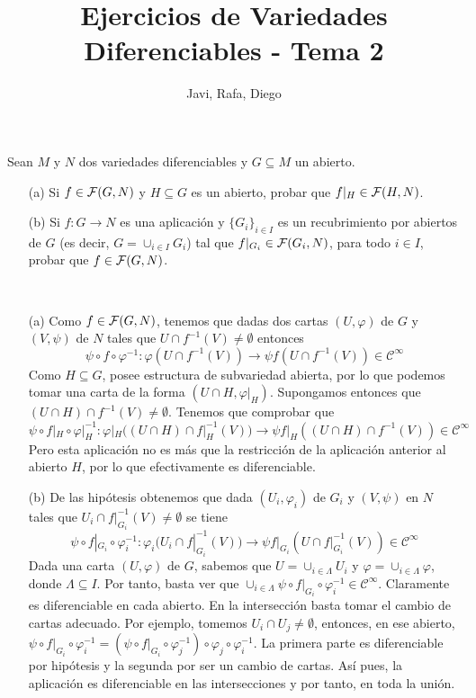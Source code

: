 \documentclass[twoside]{article}
\begin{document}
\title{Ejercicios de Variedades Diferenciables - Tema 2}
\author{Javi, Rafa, Diego}
\maketitle



\begin{ejercicio}{1}\label{1}
Sean $M$ y $N$ dos variedades diferenciables y $G \subseteq M$ un abierto.
\begin{itemize}
\item[(a)] Si $f \in \mathcal{F}(G,N)$ y $H \subseteq G$ es un abierto, probar que $f|_H \in \mathcal{F}(H,N)$.
\item[(b)] Si $f: G \to N$ es una aplicación y $\{G_i\}_{i\in I}$ es un recubrimiento por
abiertos de $G$ (es decir, $G = \cup_{i\in I} G_i$) tal que $f|_{G_i} \in \mathcal{F}(G_i,N)$, para
todo $i \in I$, probar que $f \in \mathcal{F}(G,N)$.
\end{itemize}
\end{ejercicio}
\begin{solucion}\
\begin{itemize}
\item[(a)]Como $f\in\mathcal{F}(G,N)$, tenemos que dadas dos cartas $(U,\varphi)$ de $G$ y $(V,\psi)$ de $N$ tales que $U\cap f^{-1}(V)\neq\emptyset$ entonces
$$\psi\circ f\circ\varphi^{-1}:\varphi(U\cap f^{-1}(V))\to\psi f(U\cap f^{-1}(V))\in\mathcal{C}^\infty$$ 
Como $H\subseteq G$, posee estructura de subvariedad abierta, por lo que podemos tomar una carta de la forma $(U\cap H,\varphi|_H)$. Supongamos entonces que $(U\cap H)\cap f^{-1}(V)\neq\emptyset$. Tenemos que comprobar que 
$$\psi\circ f|_H\circ\varphi|_H^{-1}:\varphi|_H((U\cap H)\cap f|_H^{-1}(V))\to\psi f|_H((U\cap H)\cap f^{-1}(V))\in\mathcal{C}^\infty$$ 
Pero esta aplicación no es más que la restricción de la aplicación anterior al abierto $H$, por lo que efectivamente es diferenciable.

\newpage

\item[(b)] De las hipótesis obtenemos que dada $(U_i,\varphi_i)$ de $G_i$ y $(V,\psi)$ en $N$ tales que $U_i\cap f|_{G_i}^{-1}(V)\neq\emptyset$ se tiene
$$\psi\circ f|_{G_i}\circ\varphi_i^{-1}:\varphi_i(U_i\cap f|_{G_i}^{-1}(V))\to\psi f|_{G_i}(U\cap f|_{G_i}^{-1}(V))\in\mathcal{C}^\infty$$
Dada una carta $(U,\varphi)$ de $G$, sabemos que $U=\cup_{i\in \Lambda}U_i$ y $\varphi=\cup_{i\in \Lambda}\varphi$, donde $\Lambda\subseteq I$. Por tanto, basta ver que $\cup_{i\in\Lambda}\psi\circ f|_{G_i}\circ\varphi_i^{-1}\in\mathcal{C}^\infty$. Claramente es diferenciable en cada abierto. En la intersección basta tomar el cambio de cartas adecuado. Por ejemplo, tomemos $U_i\cap U_j\neq\emptyset$, entonces, en ese abierto, $\psi\circ f|_{G_i}\circ\varphi_i^{-1}=(\psi\circ f|_{G_i}\circ\varphi_j^{-1})\circ\varphi_j\circ\varphi_i^{-1}$. La primera parte es diferenciable por hipótesis y la segunda por ser un cambio de cartas. Así pues, la aplicación es diferenciable en las intersecciones y por tanto, en toda la unión.
\end{itemize}
\end{solucion}
\end{document}
